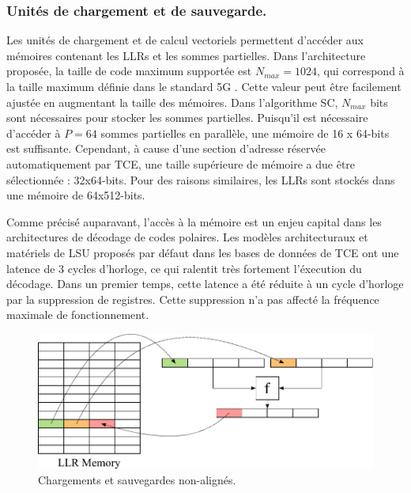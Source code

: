 \subsubsection{Unités de chargement et de sauvegarde.}



Les unités de chargement et de calcul vectoriels permettent d'accéder aux mémoires contenant les LLRs et les sommes partielles. Dans l'architecture proposée, la taille de code maximum supportée est $N_{max}=1024$, qui correspond à la taille maximum définie dans le standard 5G \cite{3gpp_ts_2017}. Cette valeur peut être facilement ajustée en augmentant la taille des mémoires. Dans l'algorithme SC, $N_{max}$ bits sont nécessaires pour stocker les sommes partielles. Puisqu'il est nécessaire d'accéder à $P=64$ sommes partielles en parallèle, une mémoire de 16 x 64-bits est suffisante. Cependant, à cause d'une section d'adresse réservée automatiquement par TCE, une taille supérieure de mémoire a due être sélectionnée : 32x64-bits. Pour des raisons similaires, les LLRs sont stockés dans une mémoire de 64x512-bits.

Comme précisé auparavant, l'accès à la mémoire est un enjeu capital dans les architectures de décodage de codes polaires. Les modèles architecturaux et matériels de LSU proposés par défaut dans les bases de données de TCE ont une latence de 3 cycles d'horloge, ce qui ralentit très fortement l'éxecution du décodage. Dans un premier temps, cette latence a été réduite à un cycle d'horloge par la suppression de registres. Cette suppression n'a pas affecté la fréquence maximale de fonctionnement.
\begin{figure}[htp]
	\centering
	\includegraphics[width=\textwidth]{main/ch4_fig/unaligned}
	\caption{Chargements et sauvegardes non-alignés.}
	\label{fig:unaligned}
\end{figure}

